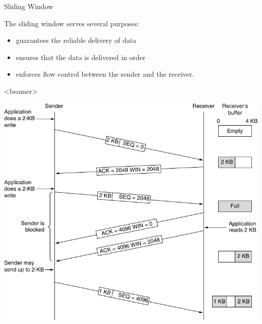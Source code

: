 \begin{frame}{Sliding Window}
  \begin{center}
  \end{center}
  \begin{block}{The sliding window serves several purposes:}
    \begin{itemize}
    \item guarantees the reliable delivery of data
    \item ensures that the data is delivered in order
    \item enforces flow control between the sender and the receiver.
    \end{itemize}
  \end{block}
\end{frame}

\begin{frame}<beamer>
  \begin{center}
    \includegraphics[width=\textwidth]{slidingwindow-ast}
  \end{center}
\end{frame}

